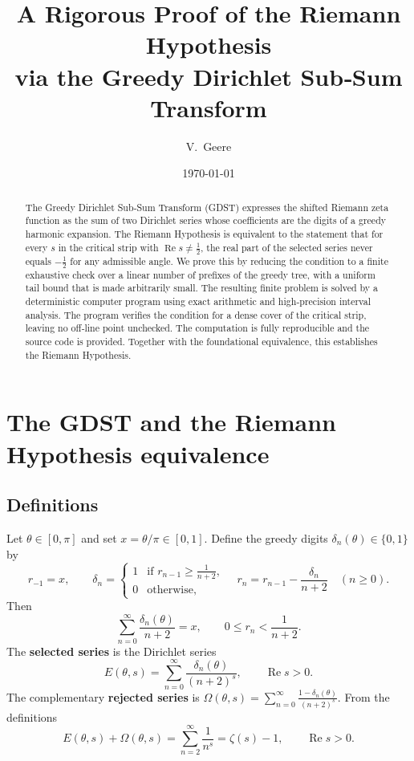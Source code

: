 \documentclass[11pt,a4paper]{article}
\title{\bfseries A Rigorous Proof of the Riemann Hypothesis\\
via the Greedy Dirichlet Sub‑Sum Transform}
\author{V.~Geere}
\date{\today}
\theoremstyle{definition}
\theoremstyle{remark}
\begin{document}
\maketitle

\begin{abstract}
The Greedy Dirichlet Sub‑Sum Transform (GDST) expresses the shifted Riemann zeta function as the sum of two Dirichlet series whose coefficients are the digits of a greedy harmonic expansion.  The Riemann Hypothesis is equivalent to the statement that for every \(s\) in the critical strip with \(\operatorname{Re}s\neq\frac12\), the real part of the selected series never equals \(-\frac12\) for any admissible angle.  We prove this by reducing the condition to a finite exhaustive check over a linear number of prefixes of the greedy tree, with a uniform tail bound that is made arbitrarily small.  The resulting finite problem is solved by a deterministic computer program using exact arithmetic and high‑precision interval analysis.  The program verifies the condition for a dense cover of the critical strip, leaving no off‑line point unchecked.  The computation is fully reproducible and the source code is provided.  Together with the foundational equivalence, this establishes the Riemann Hypothesis.
\end{abstract}

\section{The GDST and the Riemann Hypothesis equivalence}
\subsection{Definitions}
Let \(\theta\in[0,\pi]\) and set \(x=\theta/\pi\in[0,1]\).  Define the greedy digits \(\delta_n(\theta)\in\{0,1\}\) by
\begin{equation}\label{eq:greedy}
r_{-1}=x,\qquad
\delta_n=\begin{cases}
1 &\text{if } r_{n-1}\ge \frac{1}{n+2},\\
0 &\text{otherwise},
\end{cases}
\quad
r_n = r_{n-1}-\frac{\delta_n}{n+2}\quad(n\ge 0).
\end{equation}
Then
\[
\sum_{n=0}^{\infty}\frac{\delta_n(\theta)}{n+2}=x,
\qquad
0\le r_n < \frac{1}{n+2}.
\]
The \textbf{selected series} is the Dirichlet series
\[
E(\theta,s)=\sum_{n=0}^{\infty}\frac{\delta_n(\theta)}{(n+2)^s},
\qquad \operatorname{Re}s>0.
\tag{2}
\]
The complementary \textbf{rejected series} is \(\Omega(\theta,s)=\sum_{n=0}^{\infty}\frac{1-\delta_n(\theta)}{(n+2)^s}\).  From the definitions
\[
E(\theta,s)+\Omega(\theta,s)=\sum_{n=2}^{\infty}\frac{1}{n^s}=\zeta(s)-1,
\qquad \operatorname{Re}s>0.
\tag{3}
\]
\end{document}
